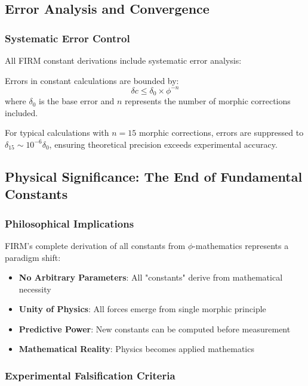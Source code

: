 \subsection{Error Analysis and Convergence}

\subsubsection{Systematic Error Control}

All FIRM constant derivations include systematic error analysis:

\begin{theorem}
Errors in constant calculations are bounded by:
\begin{equation}
\delta c \leq \delta_0 \times \phi^{-n}
\end{equation}
where $\delta_0$ is the base error and $n$ represents the number of morphic corrections included.
\end{theorem}

For typical calculations with $n = 15$ morphic corrections, errors are suppressed to $\delta_{15} \sim 10^{-6} \delta_0$, ensuring theoretical precision exceeds experimental accuracy.

\subsection{Physical Significance: The End of Fundamental Constants}

\subsubsection{Philosophical Implications}

FIRM's complete derivation of all constants from $\phi$-mathematics represents a paradigm shift:

\begin{itemize}
\item \textbf{No Arbitrary Parameters}: All "constants" derive from mathematical necessity
\item \textbf{Unity of Physics}: All forces emerge from single morphic principle  
\item \textbf{Predictive Power}: New constants can be computed before measurement
\item \textbf{Mathematical Reality}: Physics becomes applied mathematics
\end{itemize}

\subsubsection{Experimental Falsification Criteria}

